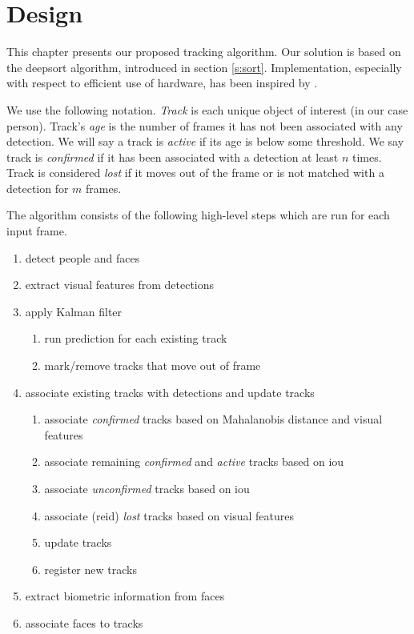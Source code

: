 \chapter{Design}\label{ch:design}

This chapter presents our proposed tracking algorithm. Our solution is based on the \gls{deepsort}\cite{Wojke2017_DeepSORT} algorithm, introduced in section \ref{s:sort}. Implementation, especially with respect to efficient use of hardware, has been inspired by \cite{yukai_yang_2020_4294717_fastmot}. 

We use the following notation. \textit{Track} is each unique object of interest (in our case person). Track's \textit{age} is the number of frames it has not been associated with any detection. We will say a track is \textit{active} if its age is below some threshold.  We say track is \textit{confirmed} if it has been associated with a detection at least $n$ times. Track is considered \textit{lost} if it moves out of the frame or is not matched with a detection for $m$ frames.

The algorithm consists of the following high-level steps which are run for each input frame.

\begin{enumerate}
    \item detect people and faces %
    \item extract visual features from detections %
    \item apply Kalman filter %
    \begin{enumerate}
        \item run prediction for each existing track
        \item mark/remove tracks that move out of frame
    \end{enumerate}
    \item associate existing tracks with detections and update tracks %
    \begin{enumerate}
        \item associate \textit{confirmed} tracks based on Mahalanobis distance and visual features 
        \item associate remaining \textit{confirmed} and \textit{active} tracks based on \gls{iou}
        \item associate \textit{unconfirmed} tracks based on \gls{iou}
        \item associate (\gls{reid}) \textit{lost} tracks based on visual features
        \item update tracks %
        \item register new tracks
    \end{enumerate}
    \item extract biometric information from faces
    \item associate faces to tracks
\end{enumerate}



